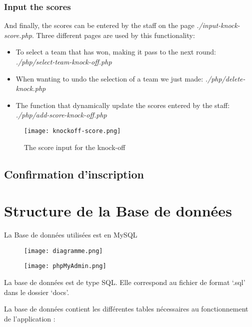 \documentclass{article}
\begin{document}
\subsubsection{Input the scores}
And finally, the scores can be entered by the staff on the page \textit{./input-knock-score.php}. Three different pages are used by this functionality:

\begin{itemize}
\item To select a team that has won, making it pass to the next round: \textit{./php/select-team-knock-off.php}
\item When wanting to undo the selection of a team we just made: \textit{./php/delete-knock.php}
\item The function that dynamically update the scores entered by the staff: \textit{./php/add-score-knock-off.php}
\end{itemize}

\begin{figure}[H]
\centering
\texttt{[image: knockoff-score.png]}
\caption{The score input for the knock-off}
\end{figure}

\subsection{Confirmation d'inscription}

\section{Structure de la Base de données}
La Base de données utilisées est en MySQL

\begin{figure}[H]
\centering
\texttt{[image: diagramme.png]}
\caption{}
\end{figure}

\begin{figure}[H]
\centering
\texttt{[image: phpMyAdmin.png]}
\caption{}
\end{figure}

La  base  de  données  est  de  type SQL. Elle  correspond  au  fichier  de  format  ‘.sql’  dans  le dossier ‘docs’.

La  base  de  données  contient  les  différentes  tables  nécessaires  au  fonctionnement  de l’application :
\end{document}
